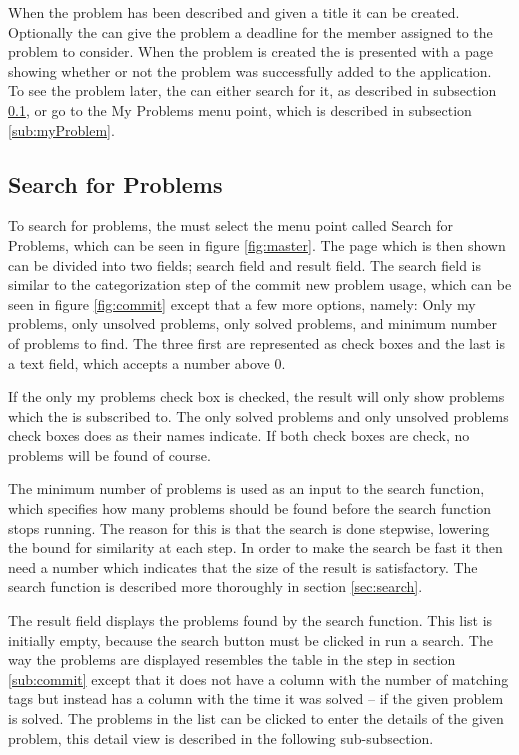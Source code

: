 When the problem has been described and given a title it can be created.
Optionally the \aclient[] can give the problem a deadline for the \astaff[] member assigned to the problem to consider.
When the problem is created the \aclient[] is presented with a page showing whether or not the problem was successfully added to the application.
To see the problem later, the \aclient[] can either search for it, as described in subsection \ref{sub:searchUsage}, or go to the My Problems menu point, which is described in subsection \ref{sub:myProblem}.

\subsection{Search for Problems}
\label{sub:searchUsage}
To search for problems, the \aclient[] must select the menu point called Search for Problems, which can be seen in figure \ref{fig:master}.
The page which is then shown can be divided into two fields; search field and result field.
The search field is similar to the categorization step of the commit new problem usage, which can be seen in figure \ref{fig:commit} except that a few more options, namely: Only my problems, only unsolved problems, only solved problems, and minimum number of problems to find.
The three first are represented as check boxes and the last is a text field, which accepts a number above 0.

If the only my problems check box is checked, the result will only show problems which the \aclient[] is subscribed to.
The only solved problems and only unsolved problems check boxes does as their names indicate.
If both check boxes are check, no problems will be found of course.

The minimum number of problems is used as an input to the search function, which specifies how many problems should be found before the search function stops running.
The reason for this is that the search is done stepwise, lowering the bound for similarity at each step.
In order to make the search be fast it then need a number which indicates that the size of the result is satisfactory.
The search function is described more thoroughly in section \ref{sec:search}.

The result field displays the problems found by the search function.
This list is initially empty, because the search button must be clicked in run a search.
The way the problems are displayed resembles the table in the  step in section \ref{sub:commit} except that it does not have a column with the number of matching tags but instead has a column with the time it was solved -- if the given problem is solved.
The problems in the list can be clicked to enter the details of the given problem, this detail view is described in the following sub-subsection.

